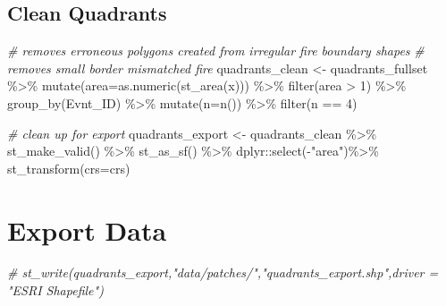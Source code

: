 \documentclass[
]{book}
\newenvironment{Shaded}{\begin{snugshade}}{\end{snugshade}}
\newcommand{\AttributeTok}[1]{\textcolor[rgb]{0.77,0.63,0.00}{#1}}
\newcommand{\CommentTok}[1]{\textcolor[rgb]{0.56,0.35,0.01}{\textit{#1}}}
\newcommand{\DecValTok}[1]{\textcolor[rgb]{0.00,0.00,0.81}{#1}}
\newcommand{\FunctionTok}[1]{\textcolor[rgb]{0.00,0.00,0.00}{#1}}
\newcommand{\NormalTok}[1]{#1}
\newcommand{\OtherTok}[1]{\textcolor[rgb]{0.56,0.35,0.01}{#1}}
\newcommand{\SpecialCharTok}[1]{\textcolor[rgb]{0.00,0.00,0.00}{#1}}
\newcommand{\StringTok}[1]{\textcolor[rgb]{0.31,0.60,0.02}{#1}}
\begin{document}
\hypertarget{clean-quadrants}{%
\subsection{Clean Quadrants}\label{clean-quadrants}}

\begin{Shaded}
\begin{Highlighting}[]
\CommentTok{\# removes erroneous polygons created from irregular fire boundary shapes}
\CommentTok{\# removes small border mismatched fire}
\NormalTok{quadrants\_clean }\OtherTok{\textless{}{-}}\NormalTok{ quadrants\_fullset }\SpecialCharTok{\%\textgreater{}\%} 
  \FunctionTok{mutate}\NormalTok{(}\AttributeTok{area=}\FunctionTok{as.numeric}\NormalTok{(}\FunctionTok{st\_area}\NormalTok{(x))) }\SpecialCharTok{\%\textgreater{}\%} 
  \FunctionTok{filter}\NormalTok{(area }\SpecialCharTok{\textgreater{}} \DecValTok{1}\NormalTok{) }\SpecialCharTok{\%\textgreater{}\%} 
  \FunctionTok{group\_by}\NormalTok{(Evnt\_ID) }\SpecialCharTok{\%\textgreater{}\%} 
  \FunctionTok{mutate}\NormalTok{(}\AttributeTok{n=}\FunctionTok{n}\NormalTok{()) }\SpecialCharTok{\%\textgreater{}\%} 
  \FunctionTok{filter}\NormalTok{(n }\SpecialCharTok{==} \DecValTok{4}\NormalTok{)}

\CommentTok{\# clean up for export}
\NormalTok{quadrants\_export }\OtherTok{\textless{}{-}}\NormalTok{ quadrants\_clean }\SpecialCharTok{\%\textgreater{}\%} 
  \FunctionTok{st\_make\_valid}\NormalTok{() }\SpecialCharTok{\%\textgreater{}\%} 
  \FunctionTok{st\_as\_sf}\NormalTok{() }\SpecialCharTok{\%\textgreater{}\%} 
\NormalTok{  dplyr}\SpecialCharTok{::}\FunctionTok{select}\NormalTok{(}\SpecialCharTok{{-}}\StringTok{"area"}\NormalTok{)}\SpecialCharTok{\%\textgreater{}\%} 
  \FunctionTok{st\_transform}\NormalTok{(}\AttributeTok{crs=}\NormalTok{crs)}
\end{Highlighting}
\end{Shaded}

\hypertarget{export-data-2}{%
\section{Export Data}\label{export-data-2}}

\begin{Shaded}
\begin{Highlighting}[]
\CommentTok{\# st\_write(quadrants\_export,"data/patches/","quadrants\_export.shp",driver = "ESRI Shapefile")}
\end{Highlighting}
\end{Shaded}
\end{document}
